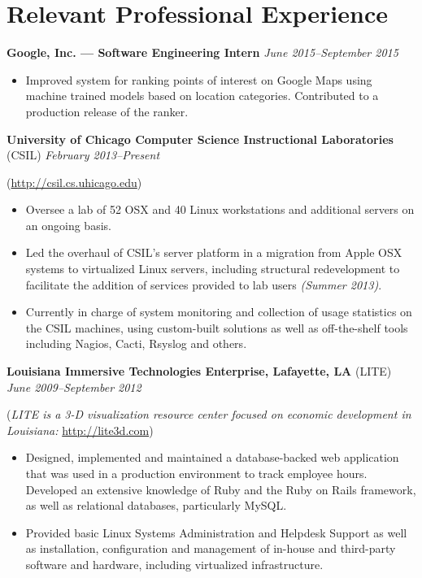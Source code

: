 \documentclass[10pt,letterpaper]{article} %
\begin{document}
    \section*{Relevant Professional Experience} 
        \textbf{Google, Inc. --- Software Engineering Intern} \hfill \textit{June 2015--September 2015} 
            \begin{itemize} 
            \item Improved system for ranking points of interest on Google Maps using machine trained models based on location categories. Contributed to a production release of the ranker.
            \end{itemize} 
            \vspace{1em}
        \textbf{University of Chicago Computer Science Instructional Laboratories} (CSIL) \hfill \textit{February 2013--Present }
            \begin{footnotesize}
                (\url{http://csil.cs.uhicago.edu})
            \end{footnotesize}
            \begin{itemize}
            \item Oversee a lab of 52 OSX and 40 Linux workstations and additional servers on an ongoing basis.
            \item Led the overhaul of CSIL's server platform in a migration from Apple OSX systems to virtualized Linux servers, including structural redevelopment to facilitate the addition of services provided to lab users \textit{(Summer 2013)}. 
            \item Currently in charge of system monitoring and collection of usage statistics on the CSIL machines, using custom-built solutions as well as off-the-shelf tools including Nagios, Cacti, Rsyslog and others. 
            \end{itemize}
            \vspace{1em}

        \textbf{Louisiana Immersive Technologies Enterprise, Lafayette, LA} (LITE) \hfill \textit{June 2009--September 2012} 

            \begin{footnotesize}
                (\textit{LITE is a 3-D visualization resource center focused on economic development in Louisiana: }\url{http://lite3d.com})
            \end{footnotesize}
            \begin{itemize} 
            \item  Designed, implemented and maintained a database-backed web application that was used in a production environment to track 
                   employee hours. Developed an extensive knowledge of Ruby and the 
                   Ruby on Rails framework, as well as relational databases, particularly MySQL.
            \item  Provided basic Linux Systems Administration and Helpdesk Support as well as installation, configuration and 
                   management of in-house and third-party software and hardware, including virtualized infrastructure.
            \end{itemize} 
\end{document}
